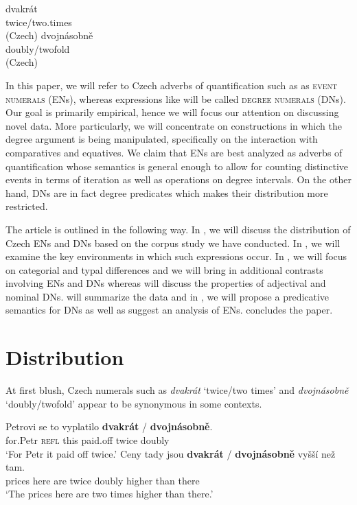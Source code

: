 \documentclass[output=paper,
modfonts,
hidelinks,
newtxmath
]{langscibook}
\begin{document}
\ea\label{twice-double-czech} \ea \gll dvakrát\label{dvakrat-czech}\\ 
          twice/two.times\\\hfill(Czech)
     \ex \gll dvojnásobně\label{dvojnasobne-czech}\\
          doubly/twofold\\\hfill(Czech)
          \z
\z

\noindent In this paper, we will refer to Czech adverbs of quantification such as  as \textsc{event numerals} (ENs), whereas expressions like  will be called \textsc{degree numerals} (DNs). Our goal is primarily empirical, hence we will focus our attention on discussing novel data. More particularly, we will concentrate on constructions in which the degree argument is being manipulated, specifically on the interaction with comparatives and equatives. We claim that ENs are best analyzed as adverbs of quantification whose semantics is general enough to allow for counting distinctive events in terms of iteration as well as operations on degree intervals. On the other hand, DNs are in fact degree predicates which makes their distribution more restricted.

The article is outlined in the following way. In , we will discuss the distribution of Czech ENs and DNs based on the corpus study we have conducted. In , we will examine the key environments in which such expressions occur. In , we will focus on categorial and typal differences and we will bring in additional contrasts involving ENs and DNs whereas  will discuss the properties of adjectival and nominal DNs.  will summarize the data and in , we will propose a predicative semantics for DNs as well as suggest an analysis of ENs.  concludes the paper.

\section{Distribution}\label{distribution}

At first blush, Czech numerals such as \textit{dvakrát} `twice/two times' and \textit{dvojnásobně} `doubly/twofold' appear to be synonymous in some contexts.

\ea \ea \gll Petrovi se to vyplatilo \textbf{dvakrát} / \textbf{dvojnásobně}.\\
for.Petr \textsc{refl} this paid.off twice {} doubly\\
\glt `For Petr it paid off twice.'
\ex \gll Ceny tady jsou \textbf{dvakrát} / \textbf{dvojnásobně} vyšší než tam.\\
prices here are twice {} doubly higher than there\\
\glt `The prices here are two times higher than there.'
\z
\z
\end{document}
